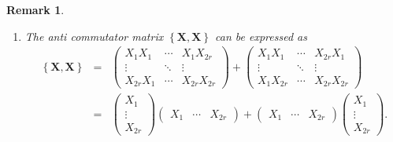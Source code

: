 \documentclass[aps,preprint]{revtex4}
\newtheorem{remark}[theorem]{Remark}
\begin{document}
\begin{remark}
\begin{enumerate}
\item The anti commutator matrix $\left\{ \boldsymbol{X},\boldsymbol{X}%
\right\} $ can be expressed as 
\begin{eqnarray}
\left\{ \boldsymbol{X},\boldsymbol{X}\right\} &=&\left( 
\begin{array}{ccc}
X_{1}X_{1} & \cdots & X_{1}X_{2r} \\ 
\vdots & \ddots & \vdots \\ 
X_{2r}X_{1} & \cdots & X_{2r}X_{2r}%
\end{array}%
\right) +\left( 
\begin{array}{ccc}
X_{1}X_{1} & \cdots & X_{2r}X_{1} \\ 
\vdots & \ddots & \vdots \\ 
X_{1}X_{2r} & \cdots & X_{2r}X_{2r}%
\end{array}%
\right) \\
&=&\left( 
\begin{array}{c}
X_{1} \\ 
\vdots \\ 
X_{2r}%
\end{array}%
\right) \left( 
\begin{array}{ccc}
X_{1} & \cdots & X_{2r}%
\end{array}%
\right) +\left( 
\begin{array}{ccc}
X_{1} & \cdots & X_{2r}%
\end{array}%
\right) \left( 
\begin{array}{c}
X_{1} \\ 
\vdots \\ 
X_{2r}%
\end{array}%
\right) .
\end{eqnarray}


\end{enumerate}
\end{remark}
\end{document}
